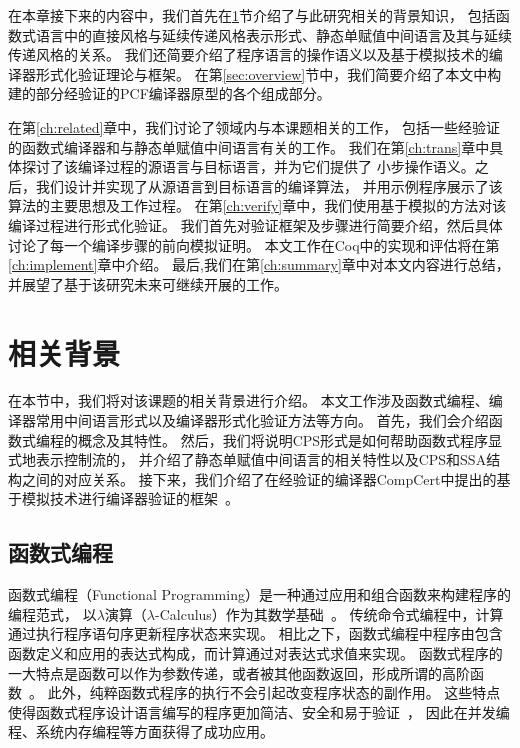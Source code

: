 在本章接下来的内容中，我们首先在\ref{sec:background}节介绍了与此研究相关的背景知识，
包括函数式语言中的直接风格与延续传递风格表示形式、静态单赋值中间语言及其与延续传递风格的关系。
我们还简要介绍了程序语言的操作语义以及基于模拟技术的编译器形式化验证理论与框架。
在第\ref{sec:overview}节中，我们简要介绍了本文中构建的部分经验证的PCF编译器原型的各个组成部分。

在第\ref{ch:related}章中，我们讨论了领域内与本课题相关的工作，
包括一些经验证的函数式编译器和与静态单赋值中间语言有关的工作。
我们在第\ref{ch:trans}章中具体探讨了该编译过程的源语言与目标语言，并为它们提供了
小步操作语义。之后，我们设计并实现了从源语言到目标语言的编译算法，
并用示例程序展示了该算法的主要思想及工作过程。
在第\ref{ch:verify}章中，我们使用基于模拟的方法对该编译过程进行形式化验证。
我们首先对验证框架及步骤进行简要介绍，然后具体讨论了每一个编译步骤的前向模拟证明。
本文工作在Coq中的实现和评估将在第\ref{ch:implement}章中介绍。
最后,我们在第\ref{ch:summary}章中对本文内容进行总结，并展望了基于该研究未来可继续开展的工作。

\section{相关背景} \label{sec:background}

在本节中，我们将对该课题的相关背景进行介绍。
本文工作涉及函数式编程、编译器常用中间语言形式以及编译器形式化验证方法等方向。
首先，我们会介绍函数式编程的概念及其特性。
然后，我们将说明CPS形式是如何帮助函数式程序显式地表示控制流的，
并介绍了静态单赋值中间语言的相关特性以及CPS和SSA结构之间的对应关系。
接下来，我们介绍了在经验证的编译器CompCert中提出的基于模拟技术进行编译器验证的框架~\cite{leroy2009formally}。

\subsection{函数式编程}

函数式编程（Functional Programming）是一种通过应用和组合函数来构建程序的编程范式，
以$\lambda$演算（$\lambda$-Calculus）作为其数学基础~\cite{church1985calculi}。
传统命令式编程中，计算通过执行程序语句序更新程序状态来实现。
相比之下，函数式编程中程序由包含函数定义和应用的表达式构成，而计算通过对表达式求值来实现。
函数式程序的一大特点是函数可以作为参数传递，或者被其他函数返回，形成所谓的高阶函数~\cite{sussman1998scheme}。
此外，纯粹函数式程序的执行不会引起改变程序状态的副作用。
这些特点使得函数式程序设计语言编写的程序更加简洁、安全和易于验证~\cite{hudak1989conception}，
因此在并发编程、系统内存编程等方面获得了成功应用。

